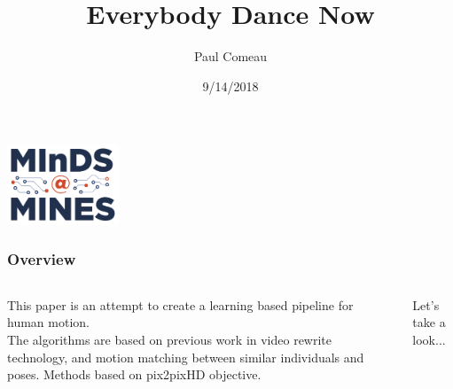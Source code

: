 \documentclass{beamer}
\title[Dance]{Everybody Dance Now}
\author{Paul Comeau}
\institute[CSM]{Colorado School of Mines}
\date{9/14/2018}
\begin{document}
    {
    \begin{frame}[plain]
        \titlepage
        \centering
            \includegraphics[width=0.25\textwidth]{images/logo.png}
    \end{frame}
    }

    \begin{frame}
        \frametitle{Overview}
        \begin{columns}
            \begin{column}{0.5\textwidth}
                \vspace{0.2in}
                This paper is an attempt to create a learning based pipeline for human motion. \\
                \vspace{0.2in}
                The algorithms are based on previous work in video rewrite technology, and motion matching between similar individuals and poses. Methods based on pix2pixHD objective. \\
                
            \end{column}
            \begin{column}{0.5\textwidth}
	     Let's take a look...
                \vspace{0.2in}
                
                \begin{center}
                \end{center}
            \end{column}
        \end{columns}
    \end{frame}
\end{document}
